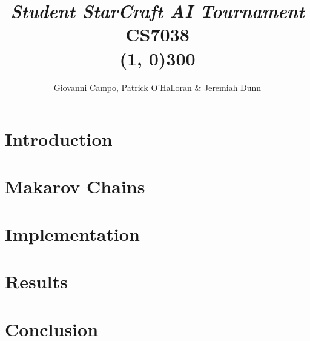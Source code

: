 \documentclass[12pt]{article}
\title{\textit{Student StarCraft AI Tournament}\hspace{0.75cm}\\
CS7038\\\line(1, 0){300}
}
\author
{Giovanni Campo, Patrick O'Halloran \& Jeremiah Dunn}
\date{}
\newenvironment{sciabstract}{%
\begin{quote} \bf}
{\end{quote}}
\begin{document}
 

\baselineskip24pt


\maketitle 




\begin{sciabstract}
 	
\end{sciabstract}


\section{Introduction}




\section{Makarov Chains}




\section{Implementation}




\section{Results}




\section{Conclusion}





\newpage


\label{endpage}
\end{document}
